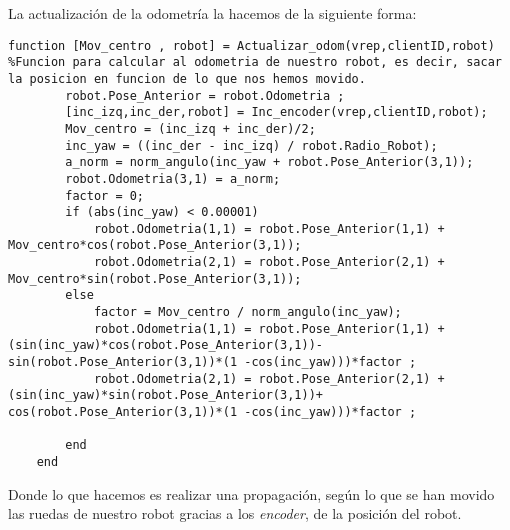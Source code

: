 La actualización de la odometría la hacemos de la siguiente forma:
\begin{lstlisting}[frame=single]
function [Mov_centro , robot] = Actualizar_odom(vrep,clientID,robot) %Funcion para calcular al odometria de nuestro robot, es decir, sacar la posicion en funcion de lo que nos hemos movido.
        robot.Pose_Anterior = robot.Odometria ;
        [inc_izq,inc_der,robot] = Inc_encoder(vrep,clientID,robot);
        Mov_centro = (inc_izq + inc_der)/2;
        inc_yaw = ((inc_der - inc_izq) / robot.Radio_Robot);
        a_norm = norm_angulo(inc_yaw + robot.Pose_Anterior(3,1));
        robot.Odometria(3,1) = a_norm;
        factor = 0;
        if (abs(inc_yaw) < 0.00001)
            robot.Odometria(1,1) = robot.Pose_Anterior(1,1) + Mov_centro*cos(robot.Pose_Anterior(3,1));
            robot.Odometria(2,1) = robot.Pose_Anterior(2,1) + Mov_centro*sin(robot.Pose_Anterior(3,1));
        else
            factor = Mov_centro / norm_angulo(inc_yaw);
            robot.Odometria(1,1) = robot.Pose_Anterior(1,1) + (sin(inc_yaw)*cos(robot.Pose_Anterior(3,1))- sin(robot.Pose_Anterior(3,1))*(1 -cos(inc_yaw)))*factor ;
            robot.Odometria(2,1) = robot.Pose_Anterior(2,1) + (sin(inc_yaw)*sin(robot.Pose_Anterior(3,1))+ cos(robot.Pose_Anterior(3,1))*(1 -cos(inc_yaw)))*factor ;
            
        end
    end
\end{lstlisting}
Donde lo que hacemos es realizar una propagación, según lo que se han movido las ruedas de nuestro robot gracias a los \textit{encoder}, de la posición del robot.

